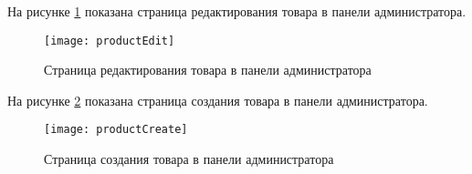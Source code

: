 На рисунке \ref{productEdit:image} показана страница редактирования товара в панели администратора.

\begin{figure}[H]
	\texttt{[image: productEdit]}
	\caption{Страница редактирования товара в панели администратора}
	\label{productEdit:image}
\end{figure}

На рисунке \ref{productCreate:image} показана страница создания товара в панели администратора.

\begin{figure}[H]
	\texttt{[image: productCreate]}
	\caption{Страница создания товара в панели администратора}
	\label{productCreate:image}
\end{figure}


